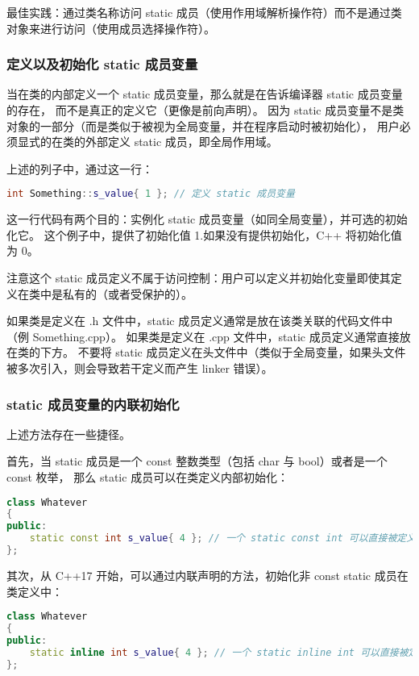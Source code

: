 \documentclass[../../LearnCpp.tex]{subfiles}
\begin{document}
最佳实践：通过类名称访问 static 成员（使用作用域解析操作符）而不是通过类对象来进行访问（使用成员选择操作符）。

\subsubsection*{定义以及初始化 static 成员变量}

当在类的内部定义一个 static 成员变量，那么就是在告诉编译器 static 成员变量的存在，
而不是真正的定义它（更像是前向声明）。
因为 static 成员变量不是类对象的一部分（而是类似于被视为全局变量，并在程序启动时被初始化），
用户必须显式的在类的外部定义 static 成员，即全局作用域。

上述的列子中，通过这一行：

\begin{lstlisting}[language=C++]
int Something::s_value{ 1 }; // 定义 static 成员变量
\end{lstlisting}

这一行代码有两个目的：实例化 static 成员变量（如同全局变量），并可选的初始化它。
这个例子中，提供了初始化值 1.如果没有提供初始化，C++ 将初始化值为 0。

注意这个 static 成员定义不属于访问控制：用户可以定义并初始化变量即使其定义在类中是私有的（或者受保护的）。

如果类是定义在 .h 文件中，static 成员定义通常是放在该类关联的代码文件中（例 Something.cpp）。
如果类是定义在 .cpp 文件中，static 成员定义通常直接放在类的下方。
不要将 static 成员定义在头文件中（类似于全局变量，如果头文件被多次引入，则会导致若干定义而产生 linker 错误）。

\subsubsection*{static 成员变量的内联初始化}

上述方法存在一些捷径。

首先，当 static 成员是一个 const 整数类型（包括 char 与 bool）或者是一个 const 枚举，
那么 static 成员可以在类定义内部初始化：

\begin{lstlisting}[language=C++]
class Whatever
{
public:
    static const int s_value{ 4 }; // 一个 static const int 可以直接被定义以及初始化
};
\end{lstlisting}

其次，从 C++17 开始，可以通过内联声明的方法，初始化非 const static 成员在类定义中：

\begin{lstlisting}[language=C++]
class Whatever
{
public:
    static inline int s_value{ 4 }; // 一个 static inline int 可以直接被定义以及初始化（C++17）
};
\end{lstlisting}
\end{document}
